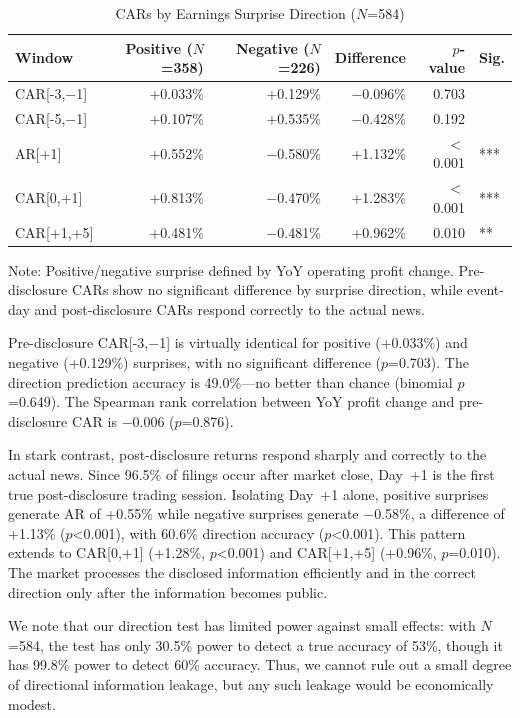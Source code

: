 \documentclass[review,authoryear]{elsarticle}
\begin{document}
\begin{table}[H]
\centering
\begin{threeparttable}
\caption{CARs by Earnings Surprise Direction ($N$=584)}
\label{tab:surprise}
\begin{tabular}{lrrrrl}
\toprule
Window & Positive ($N$=358) & Negative ($N$=226) & Difference & $p$-value & Sig. \\
\midrule
CAR[-3,$-$1] & +0.033\% & +0.129\% & $-$0.096\% & 0.703 & \\
CAR[-5,$-$1] & +0.107\% & +0.535\% & $-$0.428\% & 0.192 & \\
\midrule
AR[+1] & +0.552\% & $-$0.580\% & +1.132\% & $<$0.001 & *** \\
CAR[0,+1] & +0.813\% & $-$0.470\% & +1.283\% & $<$0.001 & *** \\
CAR[+1,+5] & +0.481\% & $-$0.481\% & +0.962\% & 0.010 & ** \\
\bottomrule
\end{tabular}
\begin{tablenotes}
\small
\item Note: Positive/negative surprise defined by YoY operating profit change. Pre-disclosure CARs show no significant difference by surprise direction, while event-day and post-disclosure CARs respond correctly to the actual news.
\end{tablenotes}
\end{threeparttable}
\end{table}

Pre-disclosure CAR[-3,$-$1] is virtually identical for positive (+0.033\%) and negative (+0.129\%) surprises, with no significant difference ($p$=0.703). The direction prediction accuracy is 49.0\%---no better than chance (binomial $p$=0.649). The Spearman rank correlation between YoY profit change and pre-disclosure CAR is $-$0.006 ($p$=0.876).

In stark contrast, post-disclosure returns respond sharply and correctly to the actual news. Since 96.5\% of filings occur after market close, Day~+1 is the first true post-disclosure trading session. Isolating Day~+1 alone, positive surprises generate AR of +0.55\% while negative surprises generate $-$0.58\%, a difference of +1.13\% ($p$<0.001), with 60.6\% direction accuracy ($p$<0.001). This pattern extends to CAR[0,+1] (+1.28\%, $p$<0.001) and CAR[+1,+5] (+0.96\%, $p$=0.010). The market processes the disclosed information efficiently and in the correct direction only after the information becomes public.

We note that our direction test has limited power against small effects: with $N$=584, the test has only 30.5\% power to detect a true accuracy of 53\%, though it has 99.8\% power to detect 60\% accuracy. Thus, we cannot rule out a small degree of directional information leakage, but any such leakage would be economically modest.
\end{document}
